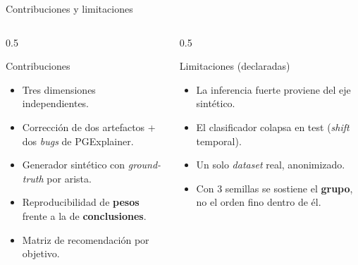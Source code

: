 \documentclass[aspectratio=169,10pt]{beamer}
\begin{document}
\begin{frame}{Contribuciones y limitaciones}
\begin{columns}[T]
\begin{column}{0.5\textwidth}
\begin{block}{Contribuciones}
\begin{itemize}\small
  \item Tres dimensiones independientes.
  \item Corrección de dos artefactos + dos \textit{bugs} de PGExplainer.
  \item Generador sintético con \textit{ground-truth} por arista.
  \item Reproducibilidad de \textbf{pesos} frente a la de \textbf{conclusiones}.
  \item Matriz de recomendación por objetivo.
\end{itemize}
\end{block}
\end{column}
\begin{column}{0.5\textwidth}
\begin{alertblock}{Limitaciones (declaradas)}
\begin{itemize}\small
  \item La inferencia fuerte proviene del eje sintético.
  \item El clasificador colapsa en test (\textit{shift} temporal).
  \item Un solo \textit{dataset} real, anonimizado.
  \item Con 3 semillas se sostiene el \textbf{grupo}, no el orden fino dentro de él.
\end{itemize}
\end{alertblock}
\end{column}
\end{columns}
\end{frame}
\end{document}
